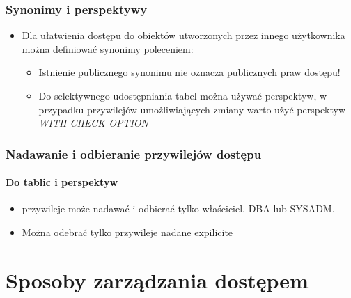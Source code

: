 \documentclass[a4paper,twoside]{article}
\begin{document}
  \section*{Synonimy i perspektywy}
      \begin{itemize}
          \item Dla ułatwienia dostępu do obiektów utworzonych przez innego użytkownika można definiować synonimy poleceniem:
          \begin{itemize}
              \item Istnienie publicznego synonimu nie oznacza publicznych praw dostępu! 
              \item Do selektywnego udostępniania tabel można używać perspektyw, w przypadku przywilejów umożliwiających zmiany warto użyć perspektyw \emph{WITH CHECK OPTION}
          \end{itemize}
      \end{itemize}

  \section*{Nadawanie i odbieranie przywilejów dostępu}
      \subsection*{Do tablic i perspektyw}
      \begin{itemize}
          \item przywileje może nadawać i odbierać tylko właściciel, DBA lub SYSADM.
          \item Można odebrać tylko przywileje nadane expilicite
      \end{itemize}


  \part*{Sposoby zarządzania dostępem}

\end{document}
